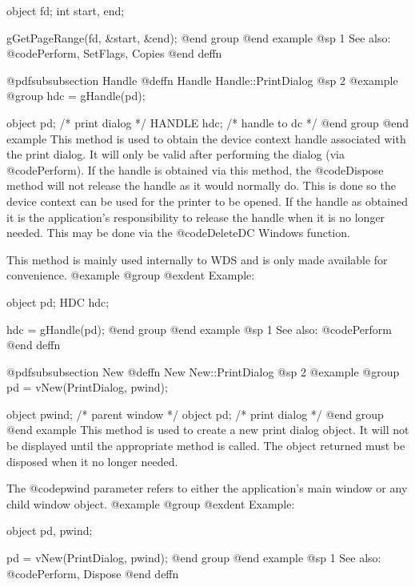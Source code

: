 object  fd;
int     start, end;

gGetPageRange(fd, &start, &end);
@end group
@end example
@sp 1
See also:  @code{Perform, SetFlags, Copies}
@end deffn











@pdfsubsubsection {Handle}
@deffn {Handle} Handle::PrintDialog
@sp 2
@example
@group
hdc = gHandle(pd);

object  pd;     /*  print dialog   */
HANDLE  hdc;    /*  handle to dc   */
@end group
@end example
This method is used to obtain the device context handle associated with
the print dialog.  It will only be valid after performing the
dialog (via @code{Perform}).  If the handle is obtained via this method,
the @code{Dispose} method will not release the handle as it would
normally do.  This is done so the device context can be used for the
printer to be opened.  If the handle as obtained it is the application's
responsibility to release the handle when it is no longer needed.  This
may be done via the @code{DeleteDC} Windows function.

This method is mainly used internally to WDS and is only made available
for convenience.
@example
@group
@exdent Example:

object  pd;
HDC     hdc;

hdc = gHandle(pd);
@end group
@end example
@sp 1
See also:  @code{Perform}
@end deffn









@pdfsubsubsection {New}
@deffn {New} New::PrintDialog
@sp 2
@example
@group
pd = vNew(PrintDialog, pwind);

object  pwind;  /*  parent window  */
object  pd;     /*  print dialog   */
@end group
@end example
This method is used to create a new print dialog object.  It will not be
displayed until the appropriate method is called.  The object returned
must be disposed when it no longer needed.

The @code{pwind} parameter refers to either the application's main window
or any child window object.
@example
@group
@exdent Example:

object  pd, pwind;

pd = vNew(PrintDialog, pwind);
@end group
@end example
@sp 1
See also:  @code{Perform, Dispose}
@end deffn













